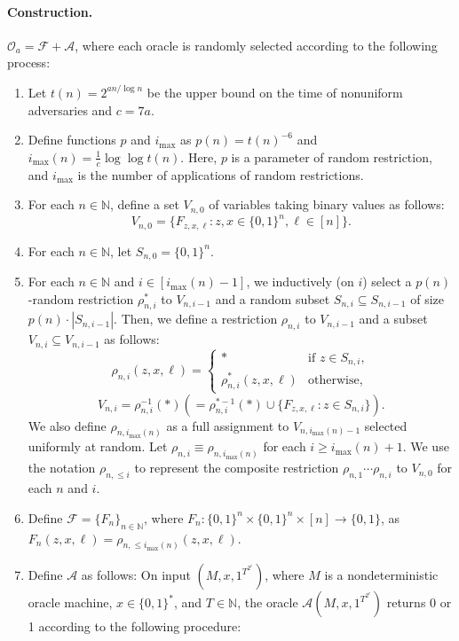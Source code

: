 \documentclass[10pt,a4paper]{article}
\begin{document}
\paragraph{Construction.}
$\mathcal O_a=\mathcal F+\mathcal A$, where each oracle is randomly selected according to the following process:
\begin{enumerate}
\item Let $t(n)=2^{an/\log n}$ be the upper bound on the time of nonuniform adversaries and $c=7a$.
\item Define functions $p$ and $i_{\max}$ as $p(n)=t(n)^{-6}$ and $i_{\max}(n)=\frac1c\log\log t(n)$. Here, $p$ is a parameter of random restriction, and $i_{\max}$ is the number of applications of random restrictions.
\item For each $n\in\mathbb N$, define a set $V_{n,0}$ of variables taking binary values as follows:
\[V_{n,0}=\{F_{z,x,\ell}:z,x\in\{0,1\}^n,\ell\in[n]\}.\]
\item For each $n\in\mathbb N$, let $S_{n,0}=\{0,1\}^n$.
\item For each $n\in\mathbb N$ and $i\in[i_{\max}(n)-1]$, we inductively (on $i$) select a $p(n)$-random restriction $\rho^*_{n,i}$ to $V_{n,i-1}$ and a random subset $S_{n,i}\subseteq S_{n,i-1}$ of size $p(n)\cdot|S_{n,i-1}|$. Then, we define a restriction $\rho_{n,i}$ to $V_{n,i-1}$ and a subset $V_{n,i}\subseteq V_{n,i-1}$ as follows:
\[\rho_{n,i}(z,x,\ell)=\begin{cases}*&\text{if }z\in S_{n,i},\\\rho^*_{n,i}(z,x,\ell)&\text{otherwise},\end{cases}\]
\[V_{n,i}=\rho_{n,i}^{-1}(*)\left(=\rho_{n,i}^{*-1}(*)\cup\{F_{z,x,\ell}:z\in S_{n,i}\}\right).\]
We also define $\rho_{n,i_{\max}(n)}$ as a full assignment to $V_{n,i_{\max}(n)-1}$ selected uniformly at random. Let $\rho_{n,i}\equiv\rho_{n,i_{\max}(n)}$ for each $i\geq i_{\max}(n)+1$. We use the notation $\rho_{n,\leq i}$ to represent the composite restriction $\rho_{n,1}\cdots\rho_{n,i}$ to $V_{n,0}$ for each $n$ and $i$.
\item Define $\mathcal F=\{F_n\}_{n\in\mathbb N}$, where $F_n:\{0,1\}^n\times\{0,1\}^n\times[n]\to\{0,1\}$, as $F_n(z,x,\ell)=\rho_{n,\leq i_{\max}(n)}(z,x,\ell)$.
\item Define $\mathcal A$ as follows: On input $(M,x,1^{T^{2^c}})$, where $M$ is a nondeterministic oracle machine, $x\in\{0,1\}^*$, and $T\in\mathbb N$, the oracle $\mathcal A(M,x,1^{T^{2^c}})$ returns 0 or 1 according to the following procedure:
\begin{enumerate}

\end{enumerate}
\end{enumerate}
\end{document}
